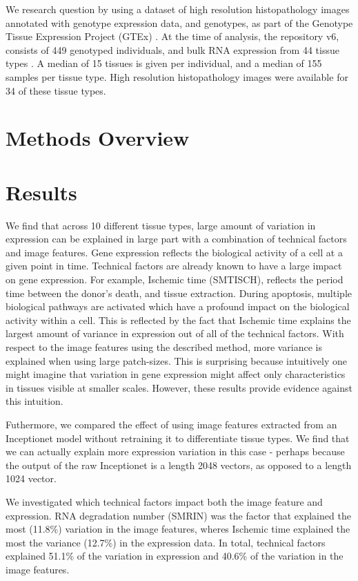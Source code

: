 \documentclass{article}
\begin{document}
We  research question by using a dataset of high resolution histopathology images annotated with genotype expression data, and genotypes, as part of the Genotype Tissue Expression Project (GTEx) \cite{GTEx-project}. At the time of analysis, the repository v6, consists of 449 genotyped individuals, and bulk RNA expression from 44 tissue types \cite{GTEx-histology}.
A median of 15 tissues is given per individual, and a median of 155 samples per tissue type. High resolution histopathology images were available for 34 of these tissue types.

\section{Methods Overview}





\section{Results}
We find that across 10 different tissue types, large amount of variation in expression can be explained in large part with a combination of technical factors and image features. Gene expression reflects the biological activity of a cell at a given point in time. Technical factors are already known to have a large impact on gene expression. For example, Ischemic time (SMTISCH), reflects the period time between the donor's death, and tissue extraction. During apoptosis, multiple biological pathways are activated which have a profound impact on the biological activity within a cell. This is reflected by the fact that Ischemic time explains the largest amount of variance in expression out of all of the technical factors. With respect to the image features using the described method, more variance is explained when using large patch-sizes. This is surprising because intuitively one might imagine that variation in gene expression might affect only characteristics in tissues visible at smaller scales. However, these results provide evidence against this intuition.

Futhermore, we compared the effect of using image features extracted from an Inceptionet model without retraining it to differentiate tissue types. We find that we can actually explain more expression variation in this case - perhaps because the output of the raw Inceptionet is a length 2048 vectors, as opposed to a length 1024 vector.

We investigated which technical factors impact both the image feature and expression. RNA degradation number (SMRIN) was the factor that explained the most (11.8\%) variation in the image features, wheres Ischemic time explained the most the variance (12.7\%) in the expression data. In total, technical factors explained 51.1\% of the variation in expression and 40.6\% of the variation in the image features.
\end{document}

